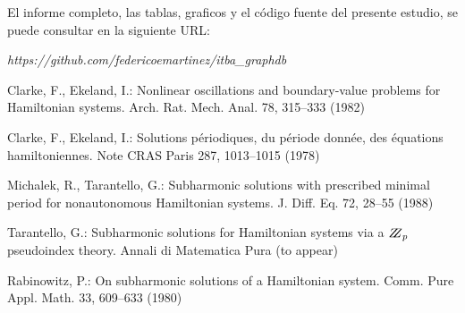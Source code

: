 \documentclass{llncs}
\begin{document}
El informe completo, las tablas, graficos y el código fuente del presente estudio, se puede consultar en la siguiente URL: 

\textit{https://github.com/federicoemartinez/itba\_graphdb}


%
%
\begin{thebibliography}{5}
%
Clarke, F., Ekeland, I.:
Nonlinear oscillations and
boundary-value problems for Hamiltonian systems.
Arch. Rat. Mech. Anal. 78, 315--333 (1982)

Clarke, F., Ekeland, I.:
Solutions p\'{e}riodiques, du
p\'{e}riode donn\'{e}e, des \'{e}quations hamiltoniennes.
Note CRAS Paris 287, 1013--1015 (1978)

Michalek, R., Tarantello, G.:
Subharmonic solutions with prescribed minimal
period for nonautonomous Hamiltonian systems.
J. Diff. Eq. 72, 28--55 (1988)

Tarantello, G.:
Subharmonic solutions for Hamiltonian
systems via a $\bbbz_{p}$ pseudoindex theory.
Annali di Matematica Pura (to appear)

Rabinowitz, P.:
On subharmonic solutions of a Hamiltonian system.
Comm. Pure Appl. Math. 33, 609--633 (1980)

\end{thebibliography}
\renewcommand{\indexname}{Author Index}
\printindex
\clearpage
{} %
\renewcommand{\indexname}{Subject Index}

\end{document}
